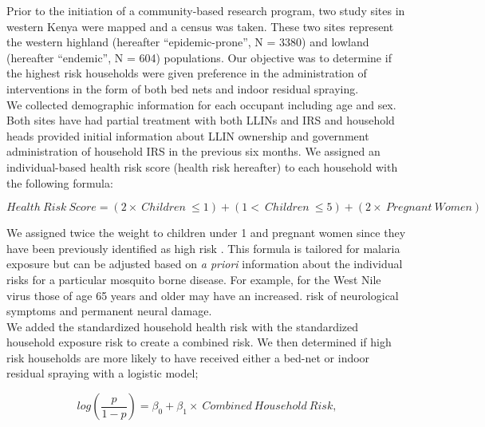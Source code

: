 \documentclass{article}\usepackage[]{graphicx}\usepackage[]{color}
\begin{document}
Prior to the initiation of a community-based research program,  two study sites in western Kenya were mapped and a census was taken. These two sites represent the western highland (hereafter “epidemic-prone”,  N = 3380) and lowland (hereafter “endemic”,  N = 604) populations. Our objective was to determine if the highest risk households were given preference in the administration of interventions in the form of both bed nets and indoor residual spraying.\\

We collected demographic information for each occupant including age and sex. Both sites have had partial treatment with both LLINs and IRS and household heads provided initial information about LLIN ownership and government administration of household IRS in the previous six months.  We assigned an individual-based health risk score (health risk hereafter) to each household with the following formula:

$$Health\ Risk\ Score  =  (2 \times \ Children\ \leq 1) + (1 < \ Children\  \leq 5) + (2 \times \ Pregnant\ Women)$$

We assigned twice the weight to children under 1 and pregnant women since they have been previously identified as high risk \cite{Gupta1999, Snow1999, Menendez2000}.  This formula is tailored for malaria exposure but can be adjusted based on \emph{a priori} information about the individual risks for a particular mosquito borne disease. For example, for the West Nile virus those of age 65 years and older may have an increased. risk of neurological symptoms and permanent neural damage.\\

We added the standardized household health risk with the standardized household exposure risk to create a combined risk.  We then determined if high risk households are more likely to have received either a bed-net or indoor residual spraying with a logistic model;

$$log(\frac{p}{1-p}) = \beta_0 + \beta_1 \times \ Combined\ Household\ Risk, $$
\end{document}

